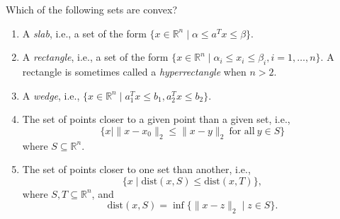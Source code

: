 Which of the following sets are convex?

\begin{enumerate}
\item A \textit{slab}, i.e., a set of the form $\{x \in \mathbb{R}^n \mid \alpha \leq a^T x \leq \beta\}$. 
\item A \textit{rectangle}, i.e., a set of the form $\{x \in \mathbb{R}^n \mid \alpha_i \leq x_i \leq \beta_i, i = 1, \dots, n\}$. A rectangle is sometimes called a \textit{hyperrectangle} when 			$n > 2$. 
\item A \textit{wedge}, i.e., $\{x \in \mathbb{R}^n \mid a_1^T x \leq b_1, a_2^T x \leq b_2\}$. 
\item The set of points closer to a given point than a given set, i.e.,
\[\{x \mid \|x - x_0\|_2 \leq \|x - y\|_2 \ \text{for all} \ y \in S\}\]
where $S \subseteq \mathbb{R}^n$. 
\item The set of points closer to one set than another, i.e.,
\[\{x \mid \text{dist}(x, S) \leq \text{dist}(x, T)\},\]
where $S, T \subseteq \mathbb{R}^n$, and
\[\text{dist}(x, S) = \inf \{\|x - z\|_2 \mid z \in S\}.\] 
\end{enumerate}

